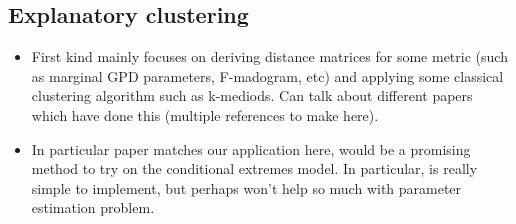 \documentclass{article}
\numberwithin{equation}{section}
\begin{document}
\subsection{Explanatory clustering}

\begin{itemize}
  \item First kind mainly focuses on deriving distance matrices for some metric (such as marginal GPD parameters, F-madogram, etc) and applying some classical clustering algorithm such as k-mediods. Can talk about different papers which have done this (multiple references to make here).
  \item In particular \cite{Vignotto2021} paper matches our application here, would be a promising method to try on the conditional extremes model. In particular, is really simple to implement, but perhaps won't help so much with parameter estimation problem. 
\end{itemize}
\end{document}
